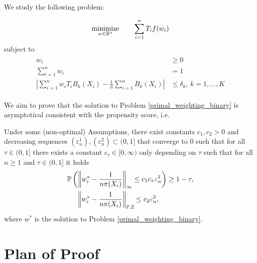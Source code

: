 We study the following problem:
\begin{problem}
  \begin{gather*}
    \underset{w \in \mathbb{R}^n}{\text{minimize}}
    \qquad
    \sum_{i = 1}^{n} T_i f(w_i)
  \end{gather*}
subject to
\begin{align}
  \label{primal_weighting_binary}
  \begin{split}
    w_i &\ge 0
    \\
    \sum_{i = 1}^{n} 
      w_i
    &=
    1
    \\
    \left| 
      \sum_{i = 1}^{n} w_i T_i B_k(X_i)
      - 
      \frac{1}{n} \sum_{i = 1}^{n} B_k(X_i)
    \right|
    &\le 
    \delta_k,\,
    k = 1, \ldots, K
  \end{split}
\end{align}
\end{problem}

We aim to prove that the solution to 
Problem \eqref{primal_weighting_binary}
is asymptotical consistent with the propensity score, i.e.

\begin{theorem}
  \label{ch_theorem_1}
  Under some (non-optimal) Assumptions,
  there exist constants
  $
    c_{1}
    , 
    c_{2}
    >
    0
  $
  and decreasing sequences
  $
    (\varepsilon_n^1)
    ,
    (\varepsilon_n^2)
    \subset
    (0,1]
  $
  that converge to 0
  such that
  for all
  $
    \tau
    \in
    (0,1]
  $
  there exists a constant
  $
    c_{\tau}
    \in
    [0,\infty)
  $
  only depending on 
  $ \tau $
  such that for all 
  $ n \ge 1 $
  and
  $
    \tau
    \in
    (0,1]
  $
  it holds
  \begin{align}
    \label{ch_theorem_1_alternative}
    \begin{split}
   & \mathbb{P}
    \left( 
  \left\lVert
    w^*_i
    -
    \frac{1}{n \pi(X_i)}
  \right\rVert_\infty
  \le 
  c_{1}
  c_{\tau}
  \varepsilon_{n}^1 
   \right)
   \ge
  1 - \tau
  ,
\\
   &\quad \
   \left\lVert
    w^*_i
    -
    \frac{1}{n \pi(X_i)}
  \right\rVert_{\mathbb{P}, 2}
  \le 
  c_{2}
  \varepsilon_n^{2},
      \end{split}
  \end{align}
  where 
  $w^*$
  is the solution to 
  Problem \eqref{primal_weighting_binary}.
\end{theorem}

\section*{Plan of Proof}

